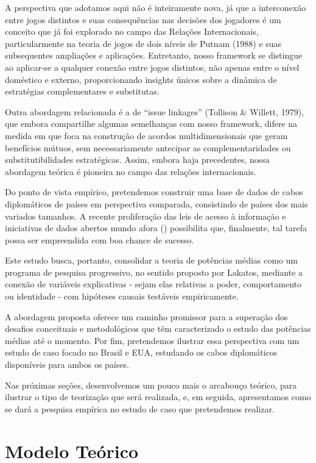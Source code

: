 \documentclass[]{interact}
\theoremstyle{plain}%
\theoremstyle{definition}
\theoremstyle{remark}
\begin{document}
A perspectiva que adotamos aqui não é inteiramente nova, já que a
interconexão entre jogos distintos e suas consequências nas decisões dos
jogadores é um conceito que já foi explorado no campo das Relações
Internacionais, particularmente na teoria de jogos de dois níveis de
Putnam (1988) e suas subsequentes ampliações e aplicações. Entretanto,
nosso framework se distingue ao aplicar-se a qualquer conexão entre
jogos distintos, não apenas entre o nível doméstico e externo,
proporcionando insights únicos sobre a dinâmica de estratégias
complementares e substitutas.

Outra abordagem relacionada é a de ``issue linkages'' (Tollison \&
Willett, 1979), que embora compartilhe algumas semelhanças com nosso
framework, difere na medida em que foca na construção de acordos
multidimensionais que geram benefícios mútuos, sem necessariamente
antecipar as complementaridades ou substitutibilidades estratégicas.
Assim, embora haja precedentes, nossa abordagem teórica é pioneira no
campo das relações internacionais.

Do ponto de vista empírico, pretendemos construir uma base de dados de
cabos diplomáticos de países em perspectiva comparada, consistindo de
países dos mais variados tamanhos. A recente proliferação das leis de
acesso à informação e iniciativas de dados abertos mundo afora
(\citet{zuffova_20}) possibilita que, finalmente, tal tarefa possa ser
empreendida com boa chance de sucesso.

Este estudo busca, portanto, consolidar a teoria de potências médias
como um programa de pesquisa progressivo, no sentido proposto por
Lakatos, mediante a conexão de variáveis explicativas - sejam elas
relativas a poder, comportamento ou identidade - com hipóteses causais
testáveis empiricamente.

A abordagem proposta oferece um caminho promissor para a superação dos
desafios conceituais e metodológicos que têm caracterizado o estudo das
potências médias até o momento. Por fim, pretendemos ilustrar essa
perspectiva com um estudo de caso focado no Brasil e EUA, estudando os
cabos diplomáticos disponíveis para ambos os países.

Nas próximas seções, desenvolvemos um pouco mais o arcabouço teórico,
para ilustrar o tipo de teorização que será realizada, e, em seguida,
apresentamos como se dará a pesquisa empírica no estudo de caso que
pretendemos realizar.

\hypertarget{modelo-teuxf3rico}{%
\section{Modelo Teórico}\label{modelo-teuxf3rico}}
\end{document}

